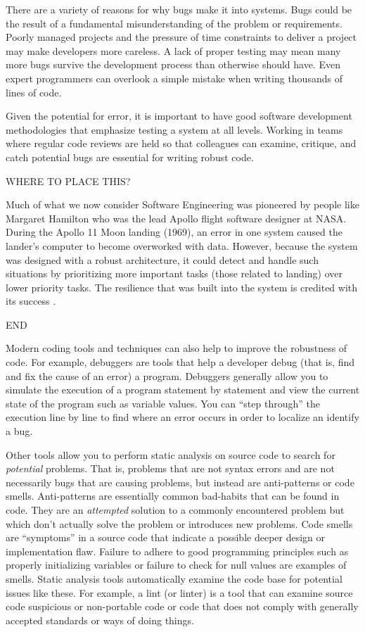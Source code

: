 There are a variety of reasons for why bugs make it into systems.
Bugs could be the result of a fundamental misunderstanding of
the problem or requirements.  Poorly managed projects and
the pressure of time constraints to deliver a project may make
developers more careless.  A lack of proper testing may mean
many more bugs survive the development process than otherwise
should have.  Even expert programmers can overlook a simple
mistake when writing thousands of lines of code.  

Given the potential for error, it is important to have good software development
methodologies that emphasize testing a system at all levels.
Working in teams where regular code reviews are held so that
colleagues can examine, critique, and catch potential bugs
are essential for writing robust code.

WHERE TO PLACE THIS?

Much of what we now consider Software Engineering was
pioneered by people like Margaret Hamilton who was the
lead Apollo flight software designer at NASA.  During the Apollo 
11 Moon landing (1969), an error in one system 
caused the lander's computer to become overworked with
data.  However, because the system was designed with a
robust architecture, it could detect and handle such situations
by prioritizing more important tasks (those related to landing)
over lower priority tasks.  The resilience that was built into
the system is credited with its success \cite{hamiltonApollo11}.

END

Modern coding tools and techniques can also help to improve
the robustness of code.  For example, \glspl{debugger} are 
tools that help a developer \gls{debug} (that is, find and fix
the cause of an error) a program.  Debuggers generally
allow you to simulate the execution of a program statement
by statement and view the current state of the program such
as variable values.  You can ``step through'' the execution
line by line to find where an error occurs in order to localize
an identify a bug.

Other tools allow you to perform \gls{static analysis} on 
source code to search for \emph{potential} problems.  
That is, problems that are not syntax errors and are not 
necessarily bugs that are causing problems, but instead 
are \glspl{anti-pattern} or \glspl{code smell}.  Anti-patterns
are essentially common bad-habits that can be found in
code.  They are an \emph{attempted} solution to a commonly
encountered problem but which don't actually solve the
problem or introduces new problems.  Code smells are 
``symptoms'' in a source code that indicate a possible
deeper design or implementation flaw.  Failure to adhere
to good programming principles such as properly initializing
variables or failure to check for null values are examples of
smells.  Static analysis tools automatically examine the
code base for potential issues like these.  For example, a
\gls{lint} (or linter) is a tool that can examine source code 
suspicious or non-portable code or code that does not
comply with generally accepted standards or ways of 
doing things.

